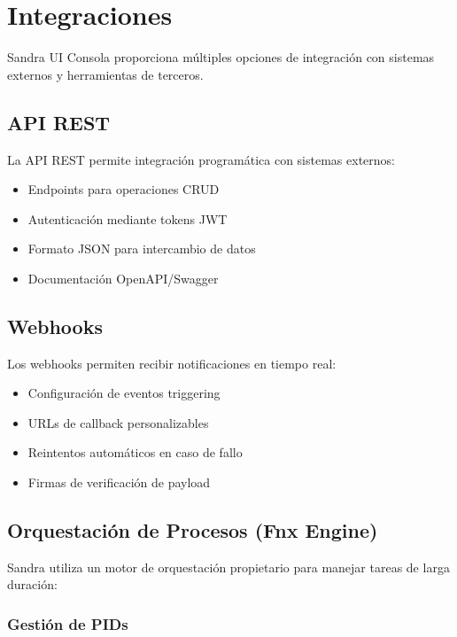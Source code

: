 
\chapter{Integraciones}

Sandra UI Consola proporciona múltiples opciones de integración con sistemas externos y herramientas de terceros.

\section{API REST}

La API REST permite integración programática con sistemas externos:

\begin{itemize}
    \item Endpoints para operaciones CRUD
    \item Autenticación mediante tokens JWT
    \item Formato JSON para intercambio de datos
    \item Documentación OpenAPI/Swagger
\end{itemize}

\section{Webhooks}

Los webhooks permiten recibir notificaciones en tiempo real:

\begin{itemize}
    \item Configuración de eventos triggering
    \item URLs de callback personalizables
    \item Reintentos automáticos en caso de fallo
    \item Firmas de verificación de payload
\end{itemize}

\section{Orquestación de Procesos (Fnx Engine)}

Sandra utiliza un motor de orquestación propietario para manejar tareas de larga duración:

\subsection{Gestión de PIDs}

